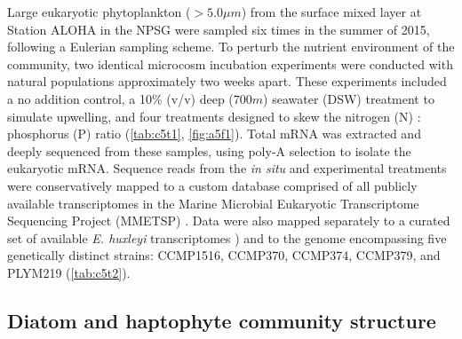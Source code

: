 Large eukaryotic phytoplankton ($>5.0 \mu m$) from the surface mixed layer at Station ALOHA in the NPSG were sampled six times in the summer of 2015, following a Eulerian sampling scheme. To perturb the nutrient environment of the community, two identical microcosm incubation experiments were conducted with natural populations approximately two weeks apart. These experiments included a no addition control, a 10\% (v/v) deep ($700m$) seawater (DSW) treatment to simulate upwelling, and four treatments designed to skew the nitrogen (N) : phosphorus (P) ratio (\cref{tab:c5t1}, \cref{fig:a5f1}). Total mRNA was extracted and deeply sequenced from these samples, using poly-A selection to isolate the eukaryotic mRNA. Sequence reads from the \textit{in situ} and experimental treatments were conservatively mapped to a custom database comprised of all publicly available transcriptomes in the Marine Microbial Eukaryotic Transcriptome Sequencing Project (MMETSP) \citep{Keeling2014}. Data were also mapped separately to a curated set of available \textit{E. huxleyi} transcriptomes \citep{Keeling2014}) and to the genome \citep{Read2013} encompassing five genetically distinct strains: CCMP1516, CCMP370, CCMP374, CCMP379, and PLYM219 (\cref{tab:c5t2}).\par


\subsection{Diatom and haptophyte community structure}


